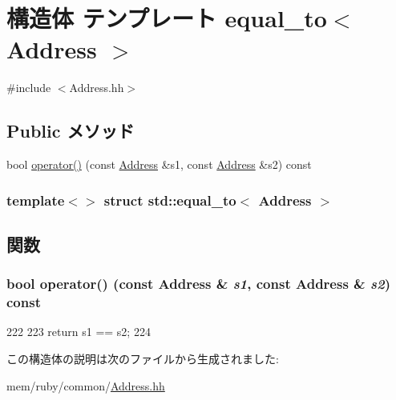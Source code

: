 \hypertarget{structstd_1_1equal__to_3_01Address_01_4}{
\section{構造体 テンプレート equal\_\-to$<$ Address $>$}
\label{structstd_1_1equal__to_3_01Address_01_4}
}


{\ttfamily \#include $<$Address.hh$>$}\subsection*{Public メソッド}
\begin{DoxyCompactItemize}
\item 
bool \hyperlink{structstd_1_1equal__to_3_01Address_01_4_af254e3341776d6ab834f50b4bf5e554c}{operator()} (const \hyperlink{classAddress}{Address} \&s1, const \hyperlink{classAddress}{Address} \&s2) const 
\end{DoxyCompactItemize}
\subsubsection*{template$<$$>$ struct std::equal\_\-to$<$ Address $>$}



\subsection{関数}
\hypertarget{structstd_1_1equal__to_3_01Address_01_4_af254e3341776d6ab834f50b4bf5e554c}{
\subsubsection[{operator()}]{\setlength{\rightskip}{0pt plus 5cm}bool operator() (const {\bf Address} \& {\em s1}, \/  const {\bf Address} \& {\em s2}) const}}
\label{structstd_1_1equal__to_3_01Address_01_4_af254e3341776d6ab834f50b4bf5e554c}



\begin{DoxyCode}
222     {
223         return s1 == s2;
224     }
\end{DoxyCode}


この構造体の説明は次のファイルから生成されました:\begin{DoxyCompactItemize}
\item 
mem/ruby/common/\hyperlink{Address_8hh}{Address.hh}\end{DoxyCompactItemize}

